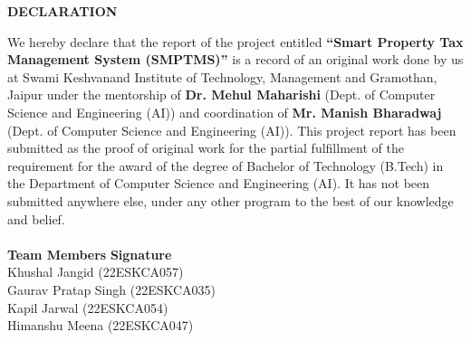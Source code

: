 \begin{center}
\thispagestyle{fancy}
{\Large \textbf{DECLARATION}}\\
\end{center}
\linespread{1.33}
\large{We hereby declare that the report of the project entitled \textbf{``Smart Property Tax Management System (SMPTMS)''} is a record of an original work done by us at Swami Keshvanand Institute of Technology, Management and Gramothan, Jaipur under the mentorship of \textbf{Dr. Mehul Maharishi} (Dept. of Computer Science and Engineering (AI)) and coordination of \textbf{Mr. Manish Bharadwaj} (Dept. of Computer Science and Engineering (AI)). This project report has been submitted as the proof of original work for the partial fulfillment of the requirement for the award of the degree of Bachelor of Technology (B.Tech) in the Department of Computer Science and Engineering (AI). It has not been submitted anywhere else, under any other program to the best of our knowledge and belief.}\\
\\
\large{\textbf{Team Members}}
\hfill
\large{\textbf{Signature}\\
Khushal Jangid (22ESKCA057)\\
Gaurav Pratap Singh (22ESKCA035)\\
Kapil Jarwal (22ESKCA054)\\
Himanshu Meena (22ESKCA047)\\
}
